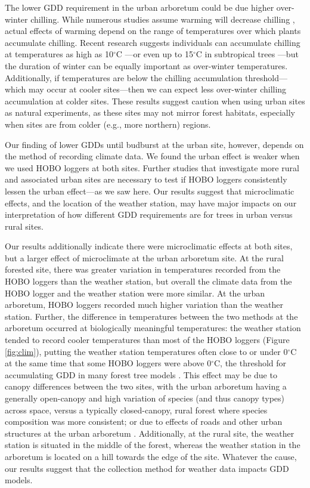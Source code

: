 \documentclass{article}\usepackage[]{graphicx}\usepackage[]{color}
\begin{document}
The lower GDD requirement in the urban arboretum could be due higher over-winter chilling. While numerous studies assume warming will decrease chilling \citep{Luedeling2011,Fu2015,Asse2018}, actual effects of warming depend on the range of temperatures over which plants accumulate chilling. Recent research suggests individuals can accumulate chilling at temperatures as high as 10$^{\circ}$C \citep{Baumgarten2021}---or even up to 15$^{\circ}$C in subtropical trees \citep{Zhang2021}---but the duration of winter can be equally important as over-winter temperatures. Additionally, if temperatures are below the chilling accumulation threshold---which may occur at cooler sites---then we can expect less over-winter chilling accumulation at colder sites. These results suggest caution when using urban sites as natural experiments, as these sites may not mirror forest habitats, especially when sites are from colder (e.g., more northern) regions. 

Our finding of lower GDDs until budburst at the urban site, however, depends on the method of recording climate data. We found the urban effect is weaker when we used HOBO loggers at both sites. Further studies that investigate more rural and associated urban sites are necessary to test if HOBO loggers consistently lessen the urban effect---as we saw here. Our results suggest that microclimatic effects, and the location of the weather station, may have major impacts on our interpretation of how different GDD requirements are for trees in urban versus rural sites. 

Our results additionally indicate there were microclimatic effects at both sites, but a larger effect of microclimate at the urban arboretum site. At the rural forested site, there was greater variation in temperatures recorded from the HOBO loggers than the weather station, but overall the climate data from the HOBO logger and the weather station were more similar. At the urban arboretum, HOBO loggers recorded much higher variation than the weather station. Further, the difference in temperatures between the two methods at the arboretum occurred at biologically meaningful temperatures: the weather station tended to record cooler temperatures than most of the HOBO loggers (Figure \ref{fig:clim}), putting the weather station temperatures often close to or under 0$^{\circ}$C at the same time that some HOBO loggers were above 0$^{\circ}$C, the threshold for accumulating GDD in many forest tree models \citep{Man2010}. This effect may be due to canopy differences between the two sites, with the urban arboretum having a generally open-canopy and high variation of species (and thus canopy types) across space, versus a typically closed-canopy, rural forest where species composition was more consistent; or due to effects of roads and other urban structures at the urban arboretum \citep{Stabler2005,Erell2012,Dimoudi2013}. Additionally, at the rural site, the weather station is situated in the middle of the forest, whereas the weather station in the arboretum is located on a hill towards the edge of the site. Whatever the cause, our results suggest that the collection method for weather data impacts GDD models.
\end{document}
